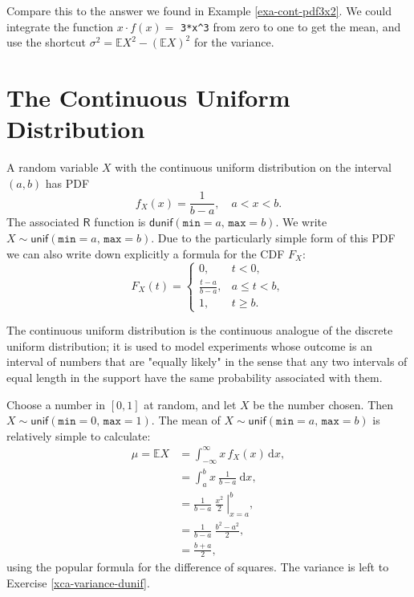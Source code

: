 Compare this to the answer we found in Example \ref{exa-cont-pdf3x2}. We could
integrate the function \(x \cdot f(x)=\) \texttt{3*x\textasciicircum{}3} from zero to one to
get the mean, and use the shortcut \(\sigma^{2}=\mathbb{E}
X^{2}-\left(\mathbb{E} X\right)^{2}\) for the variance.

\section{The Continuous Uniform Distribution}
\label{sec-6-2}

A random variable \(X\) with the continuous uniform distribution on
the interval \((a,b)\) has PDF
\begin{equation}
f_{X}(x)=\frac{1}{b-a}, \quad a < x < b.
\end{equation}
The associated \(\mathsf{R}\) function is
\(\mathsf{dunif}(\mathtt{min}=a,\,\mathtt{max}=b)\). We write
\(X\sim\mathsf{unif}(\mathtt{min}=a,\,\mathtt{max}=b)\). Due to the
particularly simple form of this PDF we can also write down explicitly
a formula for the CDF \(F_{X}\): \begin{equation} \label{eq-unif-cdf} F_{X}(t) = \begin{cases} 0, & t < 0,\\ \frac{t-a}{b-a}, & a\leq t < b,\\ 1, & t \geq b. \end{cases} \end{equation}

The continuous uniform distribution is the continuous analogue of the
discrete uniform distribution; it is used to model experiments whose
outcome is an interval of numbers that are "equally likely" in the
sense that any two intervals of equal length in the support have the
same probability associated with them.


Choose a number in \( [0,1] \) at random, and let \(X\) be the number
chosen. Then \(X\sim\mathsf{unif}(\mathtt{min}=0,\,\mathtt{max}=1)\).
The mean of \(X\sim\mathsf{unif}(\mathtt{min}=a,\,\mathtt{max}=b)\) is
relatively simple to calculate:
\begin{align*}
\mu=\mathbb{E} X & =\int_{-\infty}^{\infty}x\, f_{X}(x)\,\mathrm{d} x,\\
 & =\int_{a}^{b}x\ \frac{1}{b-a}\ \mathrm{d} x,\\
 & =\left.\frac{1}{b-a}\ \frac{x^{2}}{2}\ \right|_{x=a}^{b},\\
 & =\frac{1}{b-a}\ \frac{b^{2}-a^{2}}{2},\\
 & =\frac{b+a}{2},
\end{align*}
using the popular formula for the difference of squares. The variance
is left to Exercise \ref{xca-variance-dunif}.

